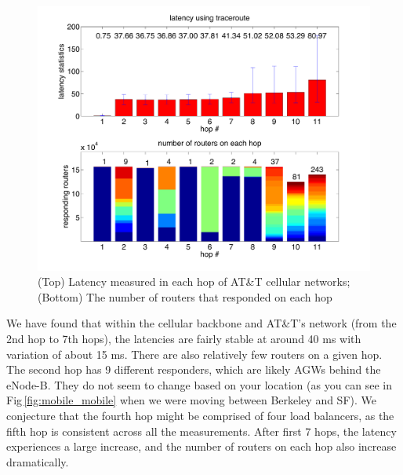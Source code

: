 \begin{figure}[t]
  \centering
  \includegraphics[width=\linewidth]{../figs/mobile_latency.pdf}
  \vspace{-1em}
  \caption{(Top) Latency measured in each hop of AT\&T cellular networks; (Bottom) The number of routers that responded on each hop}
  \label{fig:mobile_latency}
\end{figure}

We have found that within the cellular backbone and AT\&T's network (from the 2nd hop to 7th hops), the latencies are fairly stable at around 40 ms with variation of about 15 ms. There are also relatively few routers on a given hop. The second hop has 9 different responders, which are likely AGWs behind the eNode-B. They do not seem to change based on your location (as you can see in Fig\,\ref{fig:mobile_mobile} when we were moving between Berkeley and SF). We conjecture that the fourth hop might be comprised of four load balancers, as the fifth hop is consistent across all the measurements. After first 7 hops, the latency experiences a large increase, and the number of routers on each hop also increase dramatically.


